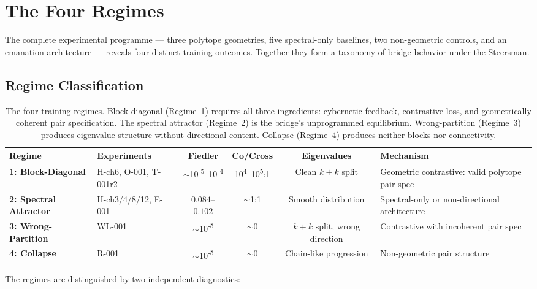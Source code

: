 \section{The Four Regimes}
\label{sec:four-regimes}

The complete experimental programme --- three polytope geometries, five
spectral-only baselines, two non-geometric controls, and an emanation
architecture --- reveals four distinct training outcomes. Together they form
a taxonomy of bridge behavior under the Steersman.

\subsection{Regime Classification}

\begin{table}[t]
\centering
\small
\begin{tabular}{llcccp{4.5cm}}
\toprule
\textbf{Regime} & \textbf{Experiments} & \textbf{Fiedler} & \textbf{Co/Cross} & \textbf{Eigenvalues} & \textbf{Mechanism} \\
\midrule
\textbf{1: Block-Diagonal} & H-ch6, O-001, T-001r2 & $\sim$10\textsuperscript{-5}--10\textsuperscript{-4} & 10\textsuperscript{4}--10\textsuperscript{5}:1 & Clean $k{+}k$ split & Geometric contrastive: valid polytope pair spec \\
\textbf{2: Spectral Attractor} & H-ch3/4/8/12, E-001 & $0.084$--$0.102$ & $\sim$1:1 & Smooth distribution & Spectral-only or non-directional architecture \\
\textbf{3: Wrong-Partition} & WL-001 & $\sim$10\textsuperscript{-5} & $\sim$0 & $k{+}k$ split, wrong direction & Contrastive with incoherent pair spec \\
\textbf{4: Collapse} & R-001 & $\sim$10\textsuperscript{-5} & $\sim$0 & Chain-like progression & Non-geometric pair structure \\
\bottomrule
\end{tabular}
\caption{The four training regimes. Block-diagonal (Regime~1) requires all
three ingredients: cybernetic feedback, contrastive loss, and geometrically
coherent pair specification. The spectral attractor (Regime~2) is the
bridge's unprogrammed equilibrium. Wrong-partition (Regime~3) produces
eigenvalue structure without directional content. Collapse (Regime~4) produces
neither blocks nor connectivity.}
\label{tab:four-regimes-full}
\end{table}

The regimes are distinguished by two independent diagnostics:

